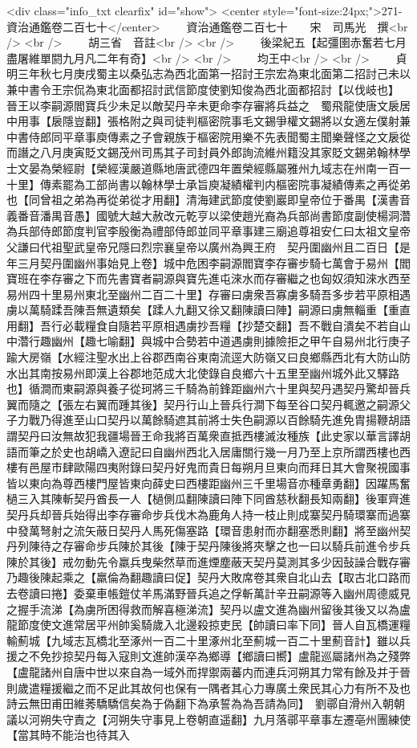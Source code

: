 <div class="info_txt clearfix" id="show">
<center style="font-size:24px;">271-資治通鑑卷二百七十</center>
  　　資治通鑑卷二百七十　　宋　司馬光　撰<br />
<br />
　　胡三省　音註<br />
<br />
　　後梁紀五【起彊圉赤奮若七月盡屠維單閼九月凡二年有奇】<br />
<br />
　　均王中<br />
<br />
　　貞明三年秋七月庚戌蜀主以桑弘志為西北面第一招討王宗宏為東北面第二招討己未以兼中書令王宗侃為東北面都招討武信節度使劉知俊為西北面都招討【以伐岐也】　晉王以李嗣源閻寶兵少未足以敵契丹辛未更命李存審將兵益之　蜀飛龍使唐文扆居中用事【扆隱豈翻】張格附之與司徒判樞密院事毛文錫爭權文錫將以女適左僕射兼中書侍郎同平章事庾傳素之子會親族于樞密院用樂不先表聞蜀主聞樂聲怪之文扆從而譖之八月庚寅貶文錫茂州司馬其子司封員外郎詢流維州籍没其家貶文錫弟翰林學士文晏為榮經尉【榮經漢嚴道縣地唐武德四年置榮經縣屬雅州九域志在州南一百一十里】傳素罷為工部尚書以翰林學士承旨庾凝績權判内樞密院事凝績傳素之再從弟也【同曾祖之弟為再從弟從才用翻】清海建武節度使劉巖即皇帝位于番禺【漢書音義番音潘禺音愚】國號大越大赦改元乾亨以梁使趙光裔為兵部尚書節度副使楊洞濳為兵部侍郎節度判官李殷衡為禮部侍郎並同平章事建三廟追尊祖安仁曰太祖文皇帝父謙曰代祖聖武皇帝兄隱曰烈宗襄皇帝以廣州為興王府　契丹圍幽州且二百日【是年三月契丹圍幽州事始見上卷】城中危困李嗣源閻寶李存審步騎七萬會于易州【閻寶班在李存審之下而先書寶者嗣源與寶先進屯淶水而存審繼之也匈奴須知淶水西至易州四十里易州東北至幽州二百二十里】存審曰虜衆吾寡虜多騎吾多步若平原相遇虜以萬騎蹂吾陳吾無遺類矣【蹂人九翻又徐又翻陳讀曰陣】嗣源曰虜無輜重【重直用翻】吾行必載糧食自隨若平原相遇虜抄吾糧【抄楚交翻】吾不戰自潰矣不若自山中濳行趣幽州【趣七喻翻】與城中合勢若中道遇虜則據險拒之甲午自易州北行庚子踰大房嶺【水經注聖水出上谷郡西南谷東南流逕大防嶺又曰良鄉縣西北有大防山防水出其南按易州即漢上谷郡地范成大北使錄自良鄉六十五里至幽州城外此又驛路也】循澗而東嗣源與養子從珂將三千騎為前鋒距幽州六十里與契丹遇契丹驚却晉兵翼而隨之【張左右翼而踵其後】契丹行山上晉兵行澗下每至谷口契丹輒邀之嗣源父子力戰乃得進至山口契丹以萬餘騎遮其前將士失色嗣源以百餘騎先進免胄揚鞭胡語謂契丹曰汝無故犯我疆場晉王命我將百萬衆直抵西樓滅汝種族【此史家以華言譯胡語而筆之於史也胡嶠入遼記曰自幽州西北入居庸關行幾一月乃至上京所謂西樓也西樓有邑屋市肆歐陽四夷附錄曰契丹好鬼而貴日每朔月旦東向而拜日其大會聚視國事皆以東向為尊西樓門屋皆東向薛史曰西樓距幽州三千里場音亦種章勇翻】因躍馬奮檛三入其陳斬契丹酋長一人【檛側瓜翻陳讀曰陣下同酋慈秋翻長知兩翻】後軍齊進契丹兵却晉兵始得出李存審命步兵伐木為鹿角人持一枝止則成寨契丹騎環寨而過寨中發萬弩射之流矢蔽日契丹人馬死傷塞路【環音患射而亦翻塞悉則翻】將至幽州契丹列陳待之存審命步兵陳於其後【陳于契丹陳後將夾擊之也一曰以騎兵前進令步兵陳於其後】戒勿動先令羸兵曳柴然草而進煙塵蔽天契丹莫測其多少因鼔譟合戰存審乃趣後陳起乘之【羸倫為翻趣讀曰促】契丹大敗席卷其衆自北山去【取古北口路而去卷讀曰捲】委棄車帳鎧仗羊馬滿野晉兵追之俘斬萬計辛丑嗣源等入幽州周德威見之握手流涕【為虜所困得救而解喜極涕流】契丹以盧文進為幽州留後其後又以為盧龍節度使文進常居平州帥奚騎歲入北邊殺掠吏民【帥讀曰率下同】晉人自瓦橋運糧輸薊城【九域志瓦橋北至涿州一百二十里涿州北至薊城一百二十里薊音計】雖以兵援之不免抄掠契丹每入寇則文進帥漢卒為鄉導【鄉讀曰嚮】盧龍巡屬諸州為之殘弊【盧龍諸州自唐中世以來自為一域外而捍禦兩蕃内而連兵河朔其力常有餘及并于晉則歲遣糧援繼之而不足此其故何也保有一隅者其心力專廣土衆民其心力有所不及也詩云無田甫田維莠驕驕信矣為于偽翻下為承誓為為吾請為同】　劉鄩自滑州入朝朝議以河朔失守責之【河朔失守事見上卷朝直遥翻】九月落鄩平章事左遷亳州團練使【當其時不能治也待其入